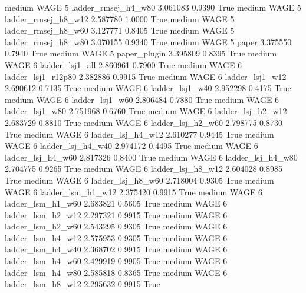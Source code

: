    medium     WAGE                 5    ladder_rmsej_h4_w80   3.061083      0.9390    True
    medium     WAGE                 5    ladder_rmsej_h8_w12   2.587780      1.0000    True
    medium     WAGE                 5    ladder_rmsej_h8_w60   3.127771      0.8405    True
    medium     WAGE                 5    ladder_rmsej_h8_w80   3.070155      0.9340    True
    medium     WAGE                 5                  paper   3.375550      0.7940    True
    medium     WAGE                 5           paper_plugin   3.395809      0.8395    True
    medium     WAGE                 6        ladder_lsj1_all   2.860961      0.7900    True
    medium     WAGE                 6     ladder_lsj1_r12p80   2.382886      0.9915    True
    medium     WAGE                 6        ladder_lsj1_w12   2.690612      0.7135    True
    medium     WAGE                 6        ladder_lsj1_w40   2.952298      0.4175    True
    medium     WAGE                 6        ladder_lsj1_w60   2.806484      0.7880    True
    medium     WAGE                 6        ladder_lsj1_w80   2.751968      0.6760    True
    medium     WAGE                 6      ladder_lsj_h2_w12   2.683729      0.8810    True
    medium     WAGE                 6      ladder_lsj_h2_w60   2.798775      0.8730    True
    medium     WAGE                 6      ladder_lsj_h4_w12   2.610277      0.9445    True
    medium     WAGE                 6      ladder_lsj_h4_w40   2.974172      0.4495    True
    medium     WAGE                 6      ladder_lsj_h4_w60   2.817326      0.8400    True
    medium     WAGE                 6      ladder_lsj_h4_w80   2.704775      0.9265    True
    medium     WAGE                 6      ladder_lsj_h8_w12   2.604028      0.8985    True
    medium     WAGE                 6      ladder_lsj_h8_w60   2.718004      0.9305    True
    medium     WAGE                 6      ladder_lsm_h1_w12   2.375420      0.9915    True
    medium     WAGE                 6      ladder_lsm_h1_w60   2.683821      0.5605    True
    medium     WAGE                 6      ladder_lsm_h2_w12   2.297321      0.9915    True
    medium     WAGE                 6      ladder_lsm_h2_w60   2.543295      0.9305    True
    medium     WAGE                 6      ladder_lsm_h4_w12   2.575953      0.9305    True
    medium     WAGE                 6      ladder_lsm_h4_w40   2.368702      0.9915    True
    medium     WAGE                 6      ladder_lsm_h4_w60   2.429919      0.9905    True
    medium     WAGE                 6      ladder_lsm_h4_w80   2.585818      0.8365    True
    medium     WAGE                 6      ladder_lsm_h8_w12   2.295632      0.9915    True
